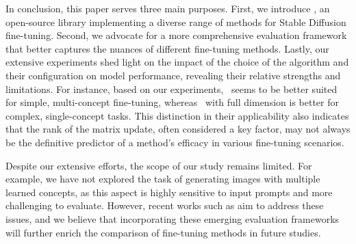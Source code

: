 In conclusion, this paper serves three main purposes. 
First, we introduce \lycoris, an open-source library implementing a diverse range of methods for Stable Diffusion fine-tuning.
Second, we advocate for a more comprehensive evaluation framework that better captures the nuances of different fine-tuning methods.
Lastly, our extensive experiments shed light on the impact of the choice of the algorithm and their configuration on model performance, revealing their relative strengths and limitations.
For instance, based on our experiments, \loha~seems to be better suited for simple, multi-concept fine-tuning, whereas \lokr~with full dimension is better for complex, single-concept tasks.
This distinction in their applicability also indicates that the rank of the matrix update, often considered a key factor, may not always be the definitive predictor of a method's efficacy in various fine-tuning scenarios.


Despite our extensive efforts, the scope of our study remains limited. For example, we have not explored the task of generating images with multiple learned concepts, as this aspect is highly sensitive to input prompts and more challenging to evaluate.
However, recent works such as \cite{huang2023t2icompbench} aim to address these issues, and we believe that incorporating these emerging evaluation frameworks will further enrich the comparison of fine-tuning methods in future studies.